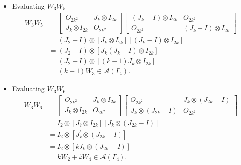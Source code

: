 \begin{itemize}
    \item Evaluating \( W_3 W_5 \)
    \begin{align*}
        W_3W_5
        &=\begin{bmatrix}
            O_{2k^2} & J_k \otimes I_{2k} \\
            J_k \otimes I_{2k} & O_{2k^2}
        \end{bmatrix}\begin{bmatrix}
            (J_k-I)\otimes I_{2k} & O_{2k^2} \\
            O_{2k^2} & (J_k-I)\otimes I_{2k}
        \end{bmatrix} \\
        &=(J_2-I) \otimes [J_k \otimes I_{2k}][(J_k-I)\otimes I_{2k}]\\
        &=(J_2-I) \otimes [J_k(J_k-I) \otimes I_{2k}]\\
        &=(J_2-I) \otimes [(k-1)J_k \otimes I_{2k}]\\
        &=(k-1)W_3\in\mathcal{A}(\Gamma_4).  
    \end{align*}
    
    \item Evaluating \( W_3 W_6 \)
    \begin{align*}
        W_3W_6
        &=\begin{bmatrix}
            O_{2k^2} & J_k \otimes I_{2k} \\
            J_k \otimes I_{2k} & O_{2k^2}
        \end{bmatrix}\begin{bmatrix}
            O_{2k^2} & J_k \otimes (J_{2k}-I) \\
            J_k \otimes (J_{2k}-I) & O_{2k^2}
        \end{bmatrix} \\
        &= I_2\otimes [J_k \otimes I_{2k}][J_k \otimes (J_{2k}-I)]\\
        &= I_2\otimes [J_k^2\otimes(J_{2k}-I)]\\
        &= I_2\otimes [kJ_k\otimes(J_{2k}-I)]\\
        &= kW_2 + kW_4\in\mathcal{A}(\Gamma_4).
    \end{align*}


\end{itemize}
